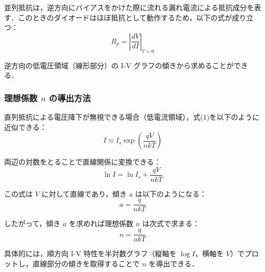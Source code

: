 並列抵抗は，逆方向にバイアスをかけた際に流れる漏れ電流による抵抗成分を表す．このときのダイオードはほぼ抵抗として動作するため，以下の式が成り立つ：
\begin{equation}
    R_p = \left| \frac{dV}{dI} \right|_{V < 0}
\end{equation}

逆方向の低電圧領域（線形部分）の I-V グラフの傾きから求めることができる．

\subsubsection*{理想係数 \( n \) の導出方法}

直列抵抗による電圧降下が無視できる場合（低電流領域），式(1)を以下のように近似できる：
\begin{equation}
    I \approx I_s \exp\left( \frac{qV}{nkT} \right)
\end{equation}

両辺の対数をとることで直線関係に変換できる：
\begin{equation}
    \ln I = \ln I_s + \frac{qV}{nkT}
\end{equation}

この式は \( V \) に対して直線であり，傾き \( a \) は以下のようになる：
\begin{equation}
    a = \frac{q}{nkT}
\end{equation}

したがって，傾き \( a \) を求めれば理想係数 \( n \) は次式で求まる：
\begin{equation}
    n = \frac{q}{akT}
\end{equation}

具体的には，順方向 I-V 特性を半対数グラフ（縦軸を \( \log I \)，横軸を \( V \)）でプロットし，直線部分の傾きを取得することで \( n \) を導出できる．

